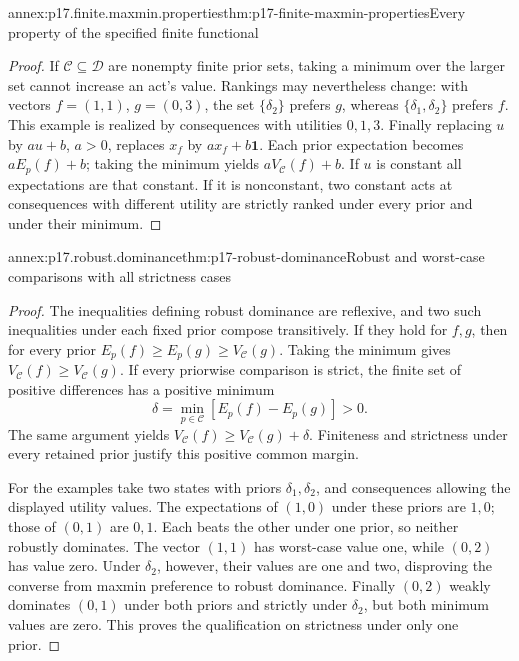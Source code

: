 \begin{annexitem}{annex:p17.finite.maxmin.properties}{thm:p17-finite-maxmin-properties}{Every property of the specified finite functional}
\begin{proof}
If \(\mathcal C\subseteq\mathcal D\) are nonempty finite
prior sets, taking a
minimum over the larger set cannot increase
an act's value. Rankings may nevertheless change:
with vectors \(f=(1,1)\), \(g=(0,3)\), the set
\(\{\delta_2\}\) prefers \(g\), whereas
\(\{\delta_1,\delta_2\}\) prefers \(f\).
This example is realized by consequences with
utilities \(0,1,3\).
Finally replacing \(u\) by \(au+b\), \(a>0\),
replaces \(x_f\) by \(ax_f+b\mathbf1\).
Each prior expectation becomes \(aE_p(f)+b\);
taking the minimum yields \(aV_{\mathcal C}(f)+b\).
If \(u\) is constant all expectations are that
constant. If it is nonconstant, two constant
acts at consequences with different utility
are strictly ranked under every prior and
under their minimum.
\end{proof}
\end{annexitem}

\begin{annexitem}{annex:p17.robust.dominance}{thm:p17-robust-dominance}{Robust and worst-case comparisons with all strictness cases}
\begin{proof}
The inequalities defining robust dominance are
reflexive, and two such inequalities under
each fixed prior compose transitively.
If they hold for \(f,g\), then for every prior
\(E_p(f)\geq E_p(g)\geq V_{\mathcal C}(g)\).
Taking the minimum gives
\(V_{\mathcal C}(f)\geq V_{\mathcal C}(g)\).
If every priorwise comparison is strict,
the finite set of positive differences has
a positive minimum
\[
               \delta=\min_{p\in\mathcal C}[E_p(f)-E_p(g)]>0.
\]
The same argument yields
\(V_{\mathcal C}(f)\geq V_{\mathcal C}(g)+\delta\).
Finiteness and strictness under every retained
prior justify this positive common margin.

For the examples take two states with priors
\(\delta_1,\delta_2\), and consequences allowing
the displayed utility values. The expectations
of \((1,0)\) under these priors are \(1,0\);
those of \((0,1)\) are \(0,1\).
Each beats the other under one prior, so
neither robustly dominates.
The vector \((1,1)\) has worst-case value
one, while \((0,2)\) has value zero.
Under \(\delta_2\), however, their values
are one and two, disproving the converse
from maxmin preference to robust dominance.
Finally \((0,2)\) weakly dominates \((0,1)\)
under both priors and strictly under
\(\delta_2\), but both minimum values are
zero. This proves the qualification on
strictness under only one prior.
\end{proof}
\end{annexitem}

